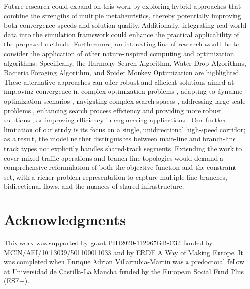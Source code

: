\documentclass[Afour,sagev,times]{sagej}
\begin{document}
Future research could expand on this work by exploring hybrid approaches that combine the strengths of multiple metaheuristics, thereby potentially improving both convergence speeds and solution quality. Additionally, integrating real-world data into the simulation framework could enhance the practical applicability of the proposed methods. Furthermore, an interesting line of research would be to consider the application of other nature-inspired computing and optimization algorithms. Specifically, the Harmony Search Algorithm, Water Drop Algorithms, Bacteria Foraging Algorithm, and Spider Monkey Optimization are highlighted. These alternative approaches can offer robust and efficient solutions aimed at improving convergence in complex optimization problems \cite{Siddique15}, adapting to dynamic optimization scenarios \cite{Siddique14a}, navigating complex search spaces \cite{Wang18}, addressing large-scale problems \cite{Akhand20}, enhancing search process efficiency and providing more robust solutions \cite{Siddique14b}, or improving efficiency in engineering applications \cite{Siddique16}. One further limitation of our study is its focus on a single, unidirectional high-speed corridor; as a result, the model neither distinguishes between main-line and branch-line track types nor explicitly handles shared-track segments. Extending the work to cover mixed-traffic operations and branch-line topologies would demand a comprehensive reformulation of both the objective function and the constraint set, with a richer problem representation to capture multiple line branches, bidirectional flows, and the nuances of shared infrastructure.


\section*{Acknowledgments}
This work was supported by grant PID2020-112967GB-C32 funded by \url{MCIN/AEI/10.13039/501100011033} and by ERDF A Way of Making Europe. It was completed when Enrique Adrian Villarrubia-Martin was a predoctoral fellow at Universidad de Castilla-La Mancha funded by the European Social Fund Plus (ESF+).


\end{document}
